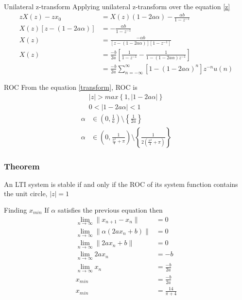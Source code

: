 \documentclass{beamer}
\providecommand{\sbrak}[1]{\ensuremath{{}\left[#1\right]}}
\providecommand{\brak}[1]{\ensuremath{\left(#1\right)}}
\providecommand{\cbrak}[1]{\ensuremath{\left\{#1\right\}}}
\theoremstyle{remark}
\providecommand{\abs}[1]{\left\vert#1\right\vert}
\providecommand{\norm}[1]{\lVert#1\rVert}
\numberwithin{equation}{section}
\begin{document}
\begin{frame}{Unilateral z-transform}
       Applying unilateral z-transform over the equation \eqref{z}
    \begin{align}
        zX\brak{z} - zx_0 &= X\brak{z}\brak{1 - 2a\alpha} - \frac{\alpha b}{1 - z^{-1}}\\
        X\brak{z}\sbrak{z - \brak{1 - 2a\alpha}} &= - \frac{\alpha b}{1 - z^{-1}} \\
        X\brak{z} &= \frac{-\alpha b}{\sbrak{z - \brak{1 - 2a\alpha}} \sbrak{1 - z^{-1}}}\\
        X\brak{z} &= \frac{-b}{2a} \sbrak{\frac{1}{1 - z^{-1}} - \frac{1}{1 - \brak{1 - 2a\alpha}z^{-1}}}\\
        &= \frac{-b}{2a}\sum_{n = -\infty}^{\infty} {\sbrak{1 - \brak{1 - 2a\alpha}^n}z^{-n}}u\brak{n} \label{transform}
    \end{align}
\end{frame}

\begin{frame}{ROC}
    From the equation \eqref{transform}, ROC is 
    \begin{align}
        \abs{z} > max\cbrak{1, \abs{1 - 2a\alpha}}\\
        0 < \abs{1 - 2a\alpha} < 1
    \end{align}
    \begin{align}
        \alpha &\in \brak{0, \frac{1}{a}}\setminus \cbrak{\frac{1}{2a}}\\
        \alpha &\in \brak{0, \frac{1}{\frac{\pi^2}{4} + \pi}} \setminus \cbrak{\frac{1}{2\brak{\frac{\pi^2}{4} + \pi}}}
    \end{align}
\end{frame}

\begin{frame}
\frametitle{Theorem}
An LTI system is stable if and only if the ROC of its system function contains the unit circle,
    $\abs{z} = 1$
\end{frame}

\begin{frame}{Finding $x_{min}$}
    If $\alpha$ satisfies the previous equation then 
    \begin{align}
        \lim_{n \to \infty}{\norm{x_{n+1} - x_n}} &= 0\\
        \lim_{n \to \infty}{\norm{\alpha\brak{2ax_n + b}}} &= 0\\
        \lim_{n \to \infty}{\norm{2ax_n + b}} &= 0\\
        \lim_{n \to \infty}{2ax_n} &= -b\\
        \lim_{n \to \infty}{x_n} &= \frac{-b}{2a}\\
        x_{min} &= \frac{-b}{2a}\\
        x_{min} &= \frac{14}{\pi + 4}\\
    \end{align}
\end{frame}
\end{document}
